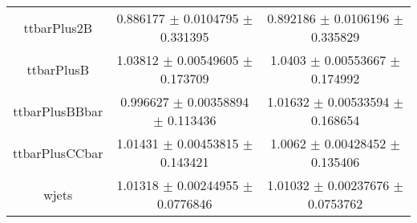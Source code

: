 \begin{table}
\begin{tabular}{ccc}
ttbarPlus2B & \num{0.886177} $\pm$ \num{0.0104795} $\pm$ \num{0.331395} & \num{0.892186} $\pm$ \num{0.0106196} $\pm$ \num{0.335829}\\
ttbarPlusB & \num{1.03812} $\pm$ \num{0.00549605} $\pm$ \num{0.173709} & \num{1.0403} $\pm$ \num{0.00553667} $\pm$ \num{0.174992}\\
ttbarPlusBBbar & \num{0.996627} $\pm$ \num{0.00358894} $\pm$ \num{0.113436} & \num{1.01632} $\pm$ \num{0.00533594} $\pm$ \num{0.168654}\\
ttbarPlusCCbar & \num{1.01431} $\pm$ \num{0.00453815} $\pm$ \num{0.143421} & \num{1.0062} $\pm$ \num{0.00428452} $\pm$ \num{0.135406}\\
wjets & \num{1.01318} $\pm$ \num{0.00244955} $\pm$ \num{0.0776846} & \num{1.01032} $\pm$ \num{0.00237676} $\pm$ \num{0.0753762}\\
\bottomrule
\end{tabular}
\end{table}